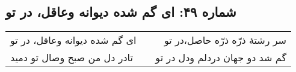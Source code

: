 \begin{center}
\section*{شماره ۴۹: ای گم شده دیوانه وعاقل، در تو}
\label{sec:049}
\begin{longtable}{l p{0.5cm} r}
ای گم شده دیوانه وعاقل، در تو
&&
سر رشتهٔ ذرّه ذرّه حاصل،‌در تو
\\
تادر دل من صبح وصال تو دمید
&&
گم شد دو جهان دردلم ودل در تو
\\
\end{longtable}
\end{center}
